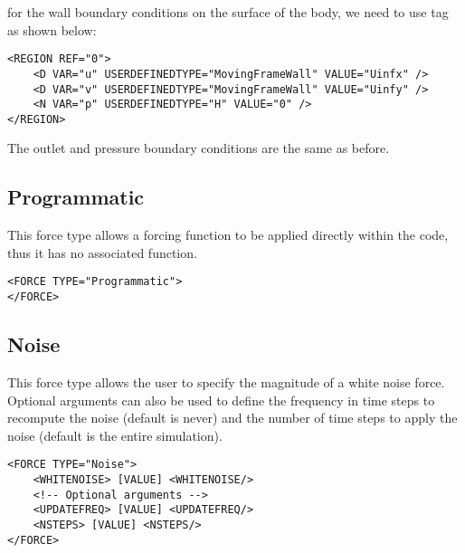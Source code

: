 for the wall boundary conditions on the surface of the body, we need to use  tag as shown below:

\begin{lstlisting}[style=XMLStyle]
<REGION REF="0"> 
    <D VAR="u" USERDEFINEDTYPE="MovingFrameWall" VALUE="Uinfx" />
    <D VAR="v" USERDEFINEDTYPE="MovingFrameWall" VALUE="Uinfy" />
    <N VAR="p" USERDEFINEDTYPE="H" VALUE="0" />  
</REGION>
\end{lstlisting}

The outlet and pressure boundary conditions are the same as before.


\subsection{Programmatic}
This force type allows a forcing function to be applied directly within the code, thus it has no associated function. 

\begin{lstlisting}[style=XMLStyle] 
<FORCE TYPE="Programmatic">
</FORCE>
\end{lstlisting}


\subsection{Noise}
This force type allows the user to specify the magnitude of a white noise force. 
Optional arguments can also be used to define the frequency in time steps to recompute the noise (default is never)
 and the number of time steps to apply the noise (default is the entire simulation).  

\begin{lstlisting}[style=XMLStyle] 
<FORCE TYPE="Noise">
    <WHITENOISE> [VALUE] <WHITENOISE/>
    <!-- Optional arguments -->
    <UPDATEFREQ> [VALUE] <UPDATEFREQ/>
    <NSTEPS> [VALUE] <NSTEPS/>
</FORCE>
\end{lstlisting}
